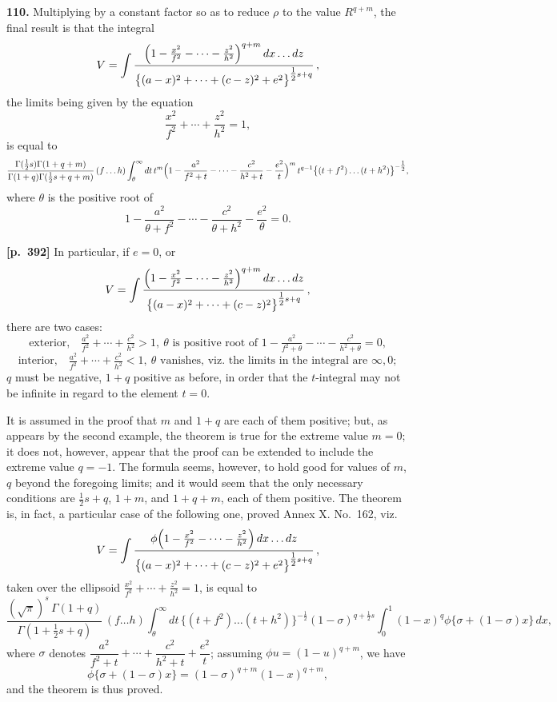 \documentclass[11pt,a4paper]{article}
\begin{document}
\textbf{110.} Multiplying by a constant factor so as to reduce $\rho$ to the value $R^{q+m}$, the final result is that the integral
\[
V = \int \frac{\Bigl(1 - \tfrac{x^{2}}{f^{2}} - \cdots - \tfrac{z^{2}}{h^{2}}\Bigr)^{q+m}\,dx\ldots dz}{\bigl\{(a-x)^{2} + \cdots + (c-z)^{2} + e^{2}\bigr\}^{\tfrac{1}{2}s + q}}\,,
\]
the limits being given by the equation
\[
\frac{x^{2}}{f^{2}} + \cdots + \frac{z^{2}}{h^{2}} = 1,
\]
is equal to
\[
\frac{\Gamma(\tfrac{1}{2}s)\Gamma(1+q+m)}{\Gamma(1+q)\Gamma(\tfrac{1}{2}s + q + m)}\,(f\ldots h)\int_{\theta}^{\infty} dt\, t^{m}\Bigl(1 - \frac{a^{2}}{f^{2}+t} - \cdots - \frac{c^{2}}{h^{2}+t} - \frac{e^{2}}{t}\Bigr)^{m}\, t^{q-1}\bigl\{(t+f^{2})\ldots(t+h^{2})\bigr\}^{-\tfrac{1}{2}},
\]
where $\theta$ is the positive root of
\[
1 - \frac{a^{2}}{\theta + f^{2}} - \cdots - \frac{c^{2}}{\theta + h^{2}} - \frac{e^{2}}{\theta} = 0.
\]

\noindent\textbf{[p.~392]}\quad
In particular, if $e = 0$, or
\[
V = \int \frac{\Bigl(1 - \tfrac{x^{2}}{f^{2}} - \cdots - \tfrac{z^{2}}{h^{2}}\Bigr)^{q+m}\,dx\ldots dz}{\bigl\{(a-x)^{2} + \cdots + (c-z)^{2}\bigr\}^{\tfrac{1}{2}s + q}}\,,
\]
there are two cases:
\[
\text{exterior,}\quad \tfrac{a^{2}}{f^{2}} + \cdots + \tfrac{c^{2}}{h^{2}} > 1,\ \theta\text{ is positive root of }1 - \tfrac{a^{2}}{f^{2}+\theta} - \cdots - \tfrac{c^{2}}{h^{2}+\theta} = 0,
\]
\[
\text{interior,}\quad \tfrac{a^{2}}{f^{2}} + \cdots + \tfrac{c^{2}}{h^{2}} < 1,\ \theta\text{ vanishes, viz.\ the limits in the integral are }\infty, 0;
\]
$q$ must be negative, $1 + q$ positive as before, in order that the $t$-integral may not be infinite in regard to the element $t = 0$.

It is assumed in the proof that $m$ and $1 + q$ are each of them positive; but, as appears by the second example, the theorem is true for the extreme value $m = 0$; it does not, however, appear that the proof can be extended to include the extreme value $q = -1$. The formula seems, however, to hold good for values of $m$, $q$ beyond the foregoing limits; and it would seem that the only necessary conditions are $\tfrac{1}{2}s + q$, $1 + m$, and $1 + q + m$, each of them positive. The theorem is, in fact, a particular case of the following one, proved Annex X. No.~162, viz.
\[
V = \int \frac{\phi\Bigl(1 - \tfrac{x^{2}}{f^{2}} - \cdots - \tfrac{z^{2}}{h^{2}}\Bigr)\,dx\ldots dz}{\bigl\{(a-x)^{2} + \cdots + (c-z)^{2} + e^{2}\bigr\}^{\tfrac{1}{2}s + q}}\,,
\]
taken over the ellipsoid $\tfrac{x^{2}}{f^{2}} + \cdots + \tfrac{z^{2}}{h^{2}} = 1$, is equal to
\[
\frac{(\sqrt{\pi})^{s}\,\Gamma(1+q)}{\Gamma(1+\tfrac{1}{2}s + q)}\,(f\ldots h)\int_{\theta}^{\infty} dt\,\bigl\{(t+f^{2})\ldots(t+h^{2})\bigr\}^{-\tfrac{1}{2}}(1 - \sigma)^{q + \tfrac{1}{2}s}\int_{0}^{1}(1 - x)^{q}\phi\{\sigma + (1-\sigma)x\}\,dx,
\]
where $\sigma$ denotes $\dfrac{a^{2}}{f^{2}+t} + \cdots + \dfrac{c^{2}}{h^{2}+t} + \dfrac{e^{2}}{t}$; assuming $\phi u = (1 - u)^{q+m}$, we have
\[
\phi\{\sigma + (1 - \sigma)x\} = (1 - \sigma)^{q+m}(1 - x)^{q+m},
\]
and the theorem is thus proved.
\end{document}
